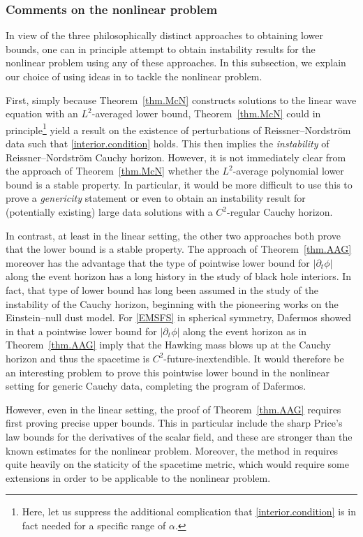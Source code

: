 \documentclass[10pt, reqno]{amsart}
\theoremstyle{definition}
\theoremstyle{remark}
\theoremstyle{conjecture}
\numberwithin{equation}{section}
\newcommand{\rd}{\partial}
\newcommand{\0}{\emptyset}
\newcommand{\alp}{\alpha}
\begin{document}
\subsubsection{Comments on the nonlinear problem}\label{linear.lower.bound.comments}

In view of the three philosophically distinct approaches to obtaining lower bounds, one can in principle attempt to obtain instability results for the nonlinear problem using any of these approaches. In this subsection, we explain our choice of using ideas in \cite{LO.instab} to tackle the nonlinear problem.

First, simply because Theorem~\ref{thm.McN} constructs solutions to the linear wave equation with an $L^2$-averaged lower bound, Theorem~\ref{thm.McN} could in principle\footnote{Here, let us suppress the additional complication that \eqref{interior.condition} is in fact needed for a specific range of $\alp$.} yield a result on the existence of perturbations of Reissner--Nordstr\"om data such that \eqref{interior.condition} holds. This then implies the \emph{instability} of Reissner--Nordstr\"om Cauchy horizon. However, it is not immediately clear from the approach of Theorem~\ref{thm.McN} whether the $L^2$-average polynomial lower bound is a stable property. In particular, it would be more difficult to use this to prove a \emph{genericity} statement or even to obtain an instability result for (potentially existing) large data solutions with a $C^2$-regular Cauchy horizon.

In contrast, at least in the linear setting, the other two approaches both prove that the lower bound is a stable property. The approach of Theorem~\ref{thm.AAG} moreover has the advantage that the type of pointwise lower bound for $|\rd_t\phi|$ along the event horizon has a long history in the study of black hole interiors. In fact, that type of lower bound has long been assumed in the study of the instability of the Cauchy horizon, beginning with the pioneering works \cite{Hiscock, PI1, PI2} on the Einstein--null dust model. For \eqref{EMSFS} in spherical symmetry, Dafermos showed in \cite{D2} that a pointwise lower bound for $|\rd_t\phi|$ along the event horizon as in Theorem~\ref{thm.AAG} imply that the Hawking mass blows up at the Cauchy horizon and thus the spacetime is $C^2$-future-inextendible. It would therefore be an interesting problem to prove this pointwise lower bound in the nonlinear setting for generic Cauchy data, completing the program of Dafermos.

However, even in the linear setting, the proof of Theorem~\ref{thm.AAG} requires first proving precise upper bounds. This in particular include the sharp Price's law bounds \cite{Price} for the derivatives of the scalar field, and these are stronger than the known estimates for the nonlinear problem. Moreover, the method in \cite{AAG} requires quite heavily on the staticity of the spacetime metric, which would require some extensions in order to be applicable to the nonlinear problem.
\end{document}
